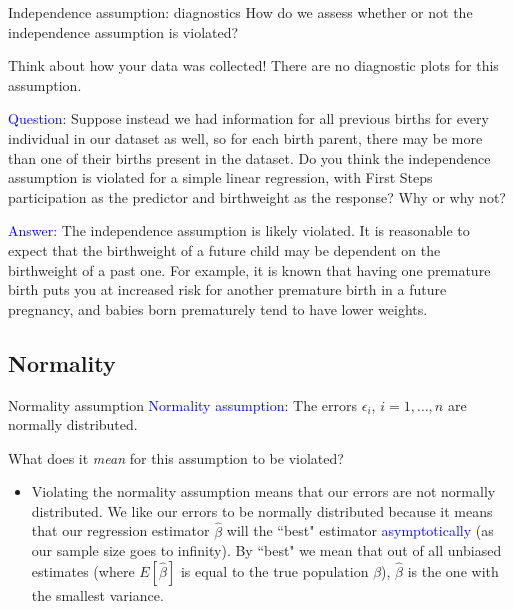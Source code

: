 \documentclass[10pt,t]{beamer}
\begin{document}
\begin{frame}{Independence assumption: diagnostics}
How do we assess whether or not the independence assumption is violated?

\vspace{0.3cm}

Think about how your data was collected! There are no diagnostic plots for this assumption.

\vspace{0.3cm}

\textcolor{blue}{Question:} Suppose instead we had information for all previous births for every individual in our dataset as well, so for each birth parent, there may be more than one of their births present in the dataset. Do you think the independence assumption is violated for a simple linear regression, with First Steps participation as the predictor and birthweight as the response? Why or why not?

\vspace{0.3cm}

\textcolor{blue}{Answer:} The independence assumption is likely violated. It is reasonable to expect that the birthweight of a future child may be dependent on the birthweight of a past one. For example, it is known that having one premature birth puts you at increased risk for another premature birth in a future pregnancy, and babies born prematurely tend to have lower weights. 

\end{frame}

\subsection{Normality}

\begin{frame}{Normality assumption}
\textcolor{blue}{Normality assumption:} The errors $\epsilon_i$, $i = 1, \dots, n$ are normally distributed.

\vspace{0.3cm}

What does it \textit{mean} for this assumption to be violated?

\vspace{0.3cm}

\begin{itemize}
	\item[] Violating the normality assumption means that our errors are not normally distributed. We like our errors to be normally distributed because it means that our regression estimator $\hat{\beta}$ will the ``best" estimator \textcolor{blue}{asymptotically} (as our sample size goes to infinity). By ``best" we mean that out of all unbiased estimates (where $E[\hat{\beta}]$ is equal to the true population $\beta$), $\hat{\beta}$ is the one with the smallest variance.
\end{itemize}
\end{frame}
\end{document}
